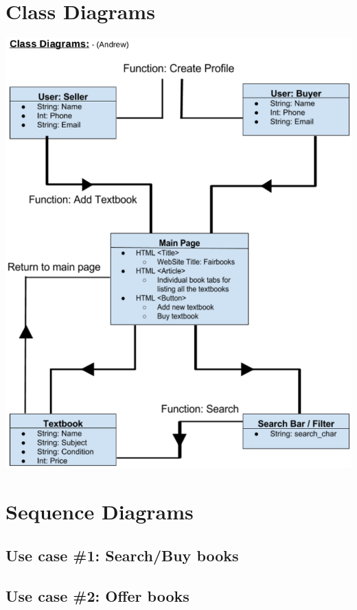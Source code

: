 \documentclass[12pt]{article}
\begin{document}
	\section{Class Diagrams}

	\includegraphics[width=14cm]{class_diagrams.eps}



	\section{Sequence Diagrams}

		\subsection{Use case \#1: Search/Buy books}



		\subsection{Use case \#2: Offer books}
\end{document}
